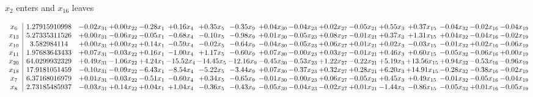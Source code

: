 \documentclass[9pt]{article}
\begin{document}
 $ x_{2} $ enters and $ x_{16} $ leaves 

 \[\begin{array}{c| c c@{\hskip 2pt} c@{\hskip 2pt} c@{\hskip 2pt} c@{\hskip 2pt} c@{\hskip 2pt} c@{\hskip 2pt} c@{\hskip 2pt} c@{\hskip 2pt} c@{\hskip 2pt} c@{\hskip 2pt} c@{\hskip 2pt} c@{\hskip 2pt} c@{\hskip 2pt} c@{\hskip 2pt} c@{\hskip 2pt} }
 x_{6}   &  1.27915910998 & -0.02 x_{31} & +  0.00 x_{22} & -0.28 x_{1} & +  0.16 x_{4} & +  0.35 x_{5} & -0.35 x_{9} & +  0.04 x_{30} & -0.04 x_{23} & +  0.02 x_{27} & -0.05 x_{21} & +  0.55 x_{3} & +  0.37 x_{15} & -0.04 x_{32} & -0.02 x_{16} & -0.04 x_{19}\\
 x_{13}   &  5.27335311526 & +  0.00 x_{31} & -0.06 x_{22} & -0.05 x_{1} & -0.68 x_{4} & -0.10 x_{5} & -0.98 x_{9} & +  0.01 x_{30} & -0.05 x_{23} & +  0.08 x_{27} & -0.01 x_{21} & +  0.37 x_{3} & +  1.31 x_{15} & +  0.04 x_{32} & -0.04 x_{16} & -0.02 x_{19}\\
 x_{10}   &  3.582984114 & +  0.00 x_{31} & +  0.00 x_{22} & +  0.14 x_{1} & -0.59 x_{4} & -0.02 x_{5} & -0.64 x_{9} & -0.04 x_{30} & -0.05 x_{23} & +  0.06 x_{27} & +  0.01 x_{21} & +  0.02 x_{3} & -0.03 x_{15} & -0.01 x_{32} & +  0.02 x_{16} & -0.06 x_{19}\\
 x_{11}   &  1.97683643433 & +  0.07 x_{31} & -0.03 x_{22} & +  0.16 x_{1} & -1.00 x_{4} & +  1.17 x_{5} & -0.60 x_{9} & +  0.07 x_{30} & -0.00 x_{23} & +  0.03 x_{27} & -0.01 x_{21} & +  0.46 x_{3} & +  0.60 x_{15} & -0.05 x_{32} & -0.06 x_{16} & +  0.00 x_{19}\\
 x_{20}   &  64.0299932329 & +  0.49 x_{31} & -1.06 x_{22} & +  4.24 x_{1} & -15.52 x_{4} & -14.45 x_{5} & -12.16 x_{9} & -0.45 x_{30} & -0.53 x_{23} & +  1.22 x_{27} & -0.22 x_{21} & +  5.19 x_{3} & + 13.56 x_{15} & +  0.94 x_{32} & -0.53 x_{16} & -0.96 x_{19}\\
 x_{18}   &  17.9181051459 & -0.10 x_{31} & -0.09 x_{22} & -6.43 x_{1} & -8.54 x_{4} & -5.22 x_{5} & -3.44 x_{9} & +  0.07 x_{30} & -0.37 x_{23} & +  0.32 x_{27} & +  0.28 x_{21} & +  6.20 x_{3} & + 14.91 x_{15} & -0.28 x_{32} & -0.38 x_{16} & -0.02 x_{19}\\
 x_{7}   &  6.37168016979 & +  0.01 x_{31} & -0.03 x_{22} & -0.51 x_{1} & -0.60 x_{4} & +  0.34 x_{5} & -0.65 x_{9} & -0.01 x_{30} & -0.00 x_{23} & +  0.06 x_{27} & -0.05 x_{21} & +  0.45 x_{3} & +  0.49 x_{15} & -0.01 x_{32} & -0.05 x_{16} & -0.04 x_{19}\\
 x_{8}   &  2.73185485937 & -0.03 x_{31} & +  0.14 x_{22} & +  0.04 x_{1} & +  1.04 x_{4} & -0.36 x_{5} & -0.43 x_{9} & -0.05 x_{30} & -0.04 x_{23} & -0.02 x_{27} & +  0.01 x_{21} & -1.44 x_{3} & -0.86 x_{15} & -0.05 x_{32} & +  0.01 x_{16} & -0.05 x_{19}\\

\end{array}\]
\end{document}

